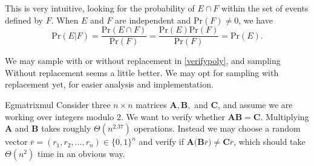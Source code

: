This is very intuitive, looking for the probability of $E\cap F$ within the set of events defined by $F$. When $E$ and $F$ are independent and $\mathrm{Pr}\left(F\right)\neq 0$, we have
\[
  \mathrm{Pr}\left(E|F\right)=\displaystyle\frac{\mathrm{Pr}\left(E\cap F\right)}{\mathrm{Pr}\left(F\right)}=\displaystyle\frac{\mathrm{Pr}\left(E\right)\mathrm{Pr}\left(F\right)}{\mathrm{Pr}\left(F\right)}=\mathrm{Pr}\left(E\right).
\]

We may sample with or without replacement in \ref{verifypoly}, and sampling Without replacement seems a little better. We may opt for sampling with replacement yet, for easier analysis and implementation.

\begin{reference}{Eg}{matrixmul}
  Consider three $n\times n$ matrices $\mathbf{A,B,}$ and $\mathbf{C}$, and assume we are working over integers modulo 2. We want to verify whether $\mathbf{AB=C}$. Multiplying $\mathbf{A}$ and $\mathbf{B}$ takes roughly $\Theta(n^{2.37})$ operations. Instead we may choose a random vector $\overline{r}=(r_1,r_2,\dots,r_n)\in\{0,1\}^n$ and verify if $\mathbf{A(B}\overline{r})\neq \mathbf{C}\overline{r}$, which should take $\Theta(n^2)$ time in an obvious way.
\end{reference}
